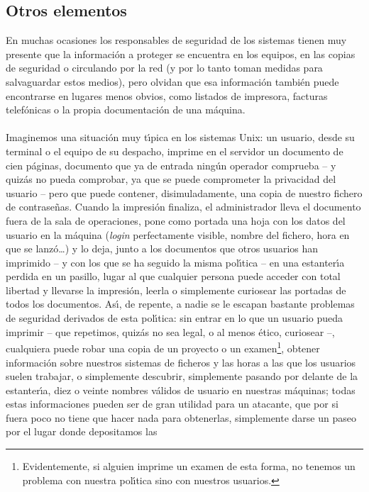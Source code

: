 \subsection{Otros elementos}
En muchas ocasiones los responsables de seguridad de los sistemas tienen muy
presente que la informaci\'on a proteger se encuentra en los equipos, en las
copias de seguridad o circulando por la red (y por lo tanto toman medidas para
salvaguardar estos medios), pero olvidan que esa informaci\'on tambi\'en puede
encontrarse en lugares menos obvios, como listados de impresora, facturas
telef\'onicas o la propia documentaci\'on de una m\'aquina.\\
\\Imaginemos una situaci\'on muy t\'{\i}pica en los sistemas Unix: un usuario,
desde su terminal o el equipo de su despacho, imprime en el servidor un 
documento de cien p\'aginas, documento que ya de entrada ning\'un operador 
comprueba -- y quiz\'as no pueda comprobar, ya que se puede comprometer la
privacidad del usuario -- pero que puede contener, disimuladamente, una copia
de nuestro fichero de contrase\~nas. Cuando la impresi\'on finaliza, el
administrador lleva el documento fuera de la sala de operaciones, pone como 
portada una hoja con los datos del usuario en la m\'aquina ({\it login} 
perfectamente visible, nombre del fichero, hora en que se lanz\'o\ldots) y lo
deja, junto a los documentos que otros usuarios han imprimido -- y con los que
se ha seguido la misma pol\'{\i}tica -- en una estanter\'{\i}a perdida en un
pasillo, lugar al que cualquier persona puede acceder con total libertad y
llevarse la impresi\'on, leerla o simplemente curiosear las portadas de todos
los documentos. As\'{\i}, de repente, a nadie se le escapan bastante problemas
de seguridad derivados de esta pol\'{\i}tica: sin entrar en lo que un usuario
pueda imprimir -- que repetimos, quiz\'as no sea legal, o al menos \'etico,
curiosear --, cualquiera puede robar una copia de un proyecto o un 
examen\footnote{Evidentemente, si alguien imprime un examen de esta forma, no
tenemos un problema con nuestra pol\'{\i}tica sino con nuestros usuarios.}, 
obtener informaci\'on sobre nuestros sistemas de ficheros y las horas a las
que los usuarios suelen trabajar, o simplemente descubrir, simplemente pasando
por delante de la estanter\'{\i}a, diez o veinte nombres v\'alidos de usuario
en nuestras m\'aquinas; todas estas informaciones pueden ser de gran utilidad
para un atacante, que por si fuera poco no tiene que hacer nada para 
obtenerlas, simplemente darse un paseo por el lugar donde depositamos las
